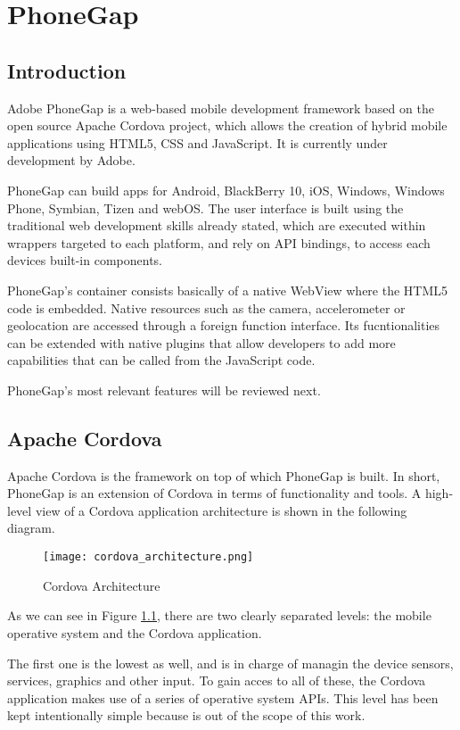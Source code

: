\chapter{PhoneGap}
\justifying
\section{Introduction}

Adobe PhoneGap is a web-based mobile development framework based on the open source Apache Cordova project, which allows the creation of hybrid mobile applications using HTML5, CSS and JavaScript. It is currently under development by Adobe.

PhoneGap can build apps for Android, BlackBerry 10, iOS, Windows, Windows Phone, Symbian, Tizen and webOS. The user interface is built using the traditional web development skills already stated, which are executed within wrappers targeted to each platform, and rely on API bindings, to access each devices built-in components. 

PhoneGap's container consists basically of a native WebView where the HTML5 code is embedded. Native resources such as the camera, accelerometer or geolocation are accessed through a foreign function interface. Its fucntionalities can be extended with native plugins that allow developers to add more capabilities that can be called from the JavaScript code.

PhoneGap's most relevant features will be reviewed next.

\section{Apache Cordova}

Apache Cordova is the framework on top of which PhoneGap is built. In short, PhoneGap is an extension of Cordova in terms of functionality and tools. A high-level view of a Cordova application architecture is shown in the following diagram.

\begin{figure}[H]
	\centering
	\texttt{[image: cordova\_architecture.png]}
	\caption{Cordova Architecture\label{fig:cordarch}}
\end{figure}

As we can see in Figure \ref{fig:cordarch}, there are two clearly separated levels: the mobile operative system and the Cordova application. 

The first one is the lowest as well, and is in charge of managin the device sensors, services, graphics and other input. To gain acces to all of these, the Cordova application makes use of a series of operative system APIs. This level has been kept intentionally simple because is out of the scope of this work.

